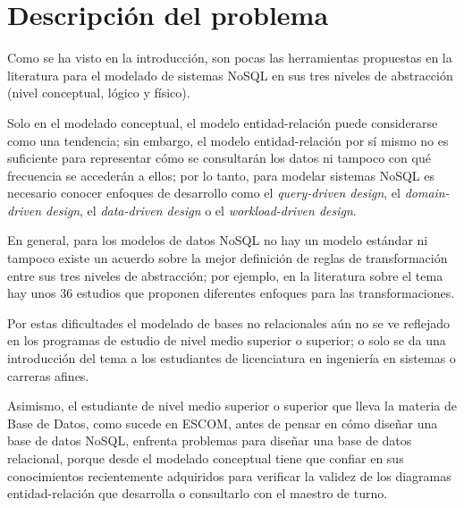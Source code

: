 \section{Descripción del problema}
Como se ha visto en la introducción, son pocas las herramientas propuestas en la literatura para el modelado de sistemas NoSQL en sus tres niveles de abstracción (nivel conceptual, lógico y físico).


Solo en el modelado conceptual, el modelo entidad-relación puede considerarse como una tendencia; sin embargo, el modelo entidad-relación por sí mismo no es suficiente para representar cómo se consultarán los datos ni tampoco con qué frecuencia se accederán a ellos; por lo tanto, para modelar sistemas NoSQL es necesario conocer enfoques de desarrollo como el \textit{query-driven design}, el \textit{domain-driven design}, el \textit{data-driven design} o el \textit{workload-driven design}.


En general, para los modelos de datos NoSQL no hay un modelo estándar ni tampoco existe un acuerdo sobre la mejor definición de reglas de transformación entre sus tres niveles de abstracción; por ejemplo, en la literatura sobre el tema hay unos 36 estudios\cite{martinez-mosquera_modeling_2020} que proponen diferentes enfoques para las transformaciones.


Por estas dificultades el modelado de bases no relacionales aún no se ve reflejado en los programas de estudio de nivel medio superior o superior; o solo se da una introducción del tema a los estudiantes de licenciatura en ingeniería en sistemas o carreras afines.


Asimismo, el estudiante de nivel medio superior o superior que lleva la materia de Base de Datos, como sucede en ESCOM, antes de pensar en cómo diseñar una base de datos NoSQL, enfrenta problemas para diseñar una base de datos relacional, porque desde el modelado conceptual tiene que confiar en sus conocimientos recientemente adquiridos para verificar la validez de los diagramas entidad-relación que desarrolla o consultarlo con el maestro de turno.


